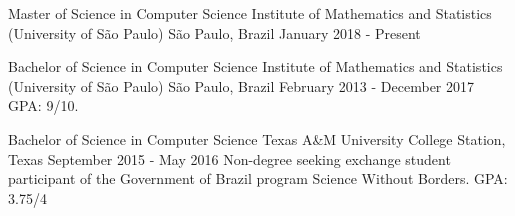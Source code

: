 \documentclass[11pt, a4paper]{awesome-cv-res}
\begin{document}
\makecvheader
\makecvfooter
  {}
  {}
  {\thepage}



\begin{cventries}
\cventry
{Master of Science in Computer Science}
{Institute of Mathematics and Statistics (University of São Paulo)} %
{São Paulo, Brazil} %
{January 2018 - Present}
{}
\newline

\cventry
{Bachelor of Science in Computer Science} %
{Institute of Mathematics and Statistics (University of São Paulo)} %
{São Paulo, Brazil} %
{February 2013 - December 2017} %
{GPA: 9/10.}
\newline
\newline

\cventry
{Bachelor of Science in Computer Science}
{Texas A\&M University}
{College Station, Texas}
{September 2015 - May 2016}
{Non-degree seeking exchange student participant of the Government of Brazil program Science Without Borders. \newline GPA: 3.75/4}
\end{cventries}
\end{document}
